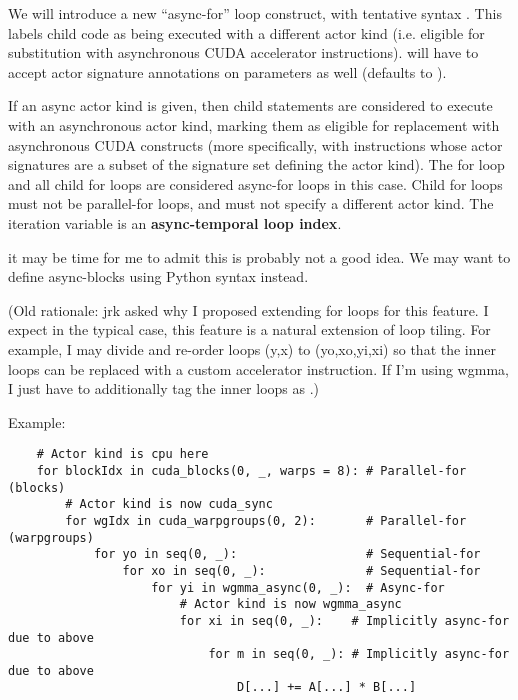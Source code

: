 \filbreak
{} We will introduce a new ``async-for'' loop construct, with tentative syntax .
This labels child code as being executed with a different actor kind (i.e. eligible for substitution with asynchronous CUDA accelerator instructions).
 will have to accept actor signature annotations on parameters as well (defaults to ).

If an async actor kind is given, then child statements are considered to execute with an asynchronous actor kind, marking them as eligible for replacement with asynchronous CUDA constructs (more specifically, with instructions whose actor signatures are a subset of the signature set defining the actor kind).
The for loop and all child for loops are considered async-for loops in this case.
Child for loops must not be parallel-for loops, and must not specify a different actor kind.
The iteration variable is an \textbf{async-temporal loop index}.

\filbreak
{} it may be time for me to admit this is probably not a good idea.
We may want to define async-blocks using Python  syntax instead.

\filbreak
(Old rationale: jrk asked why I proposed extending for loops for this feature.
I expect in the typical case, this feature is a natural extension of loop tiling.
For example, I may divide and re-order loops (y,x) to (yo,xo,yi,xi) so that the inner loops can be replaced with a custom accelerator instruction.
If I'm using wgmma, I just have to additionally tag the inner loops as .)

\filbreak
Example:
{\color{lightttColor}
\begin{verbatim}
    # Actor kind is cpu here
    for blockIdx in cuda_blocks(0, _, warps = 8): # Parallel-for (blocks)
        # Actor kind is now cuda_sync
        for wgIdx in cuda_warpgroups(0, 2):       # Parallel-for (warpgroups)
            for yo in seq(0, _):                  # Sequential-for
                for xo in seq(0, _):              # Sequential-for
                    for yi in wgmma_async(0, _):  # Async-for
                        # Actor kind is now wgmma_async
                        for xi in seq(0, _):    # Implicitly async-for due to above
                            for m in seq(0, _): # Implicitly async-for due to above
                                D[...] += A[...] * B[...]
\end{verbatim}
}

